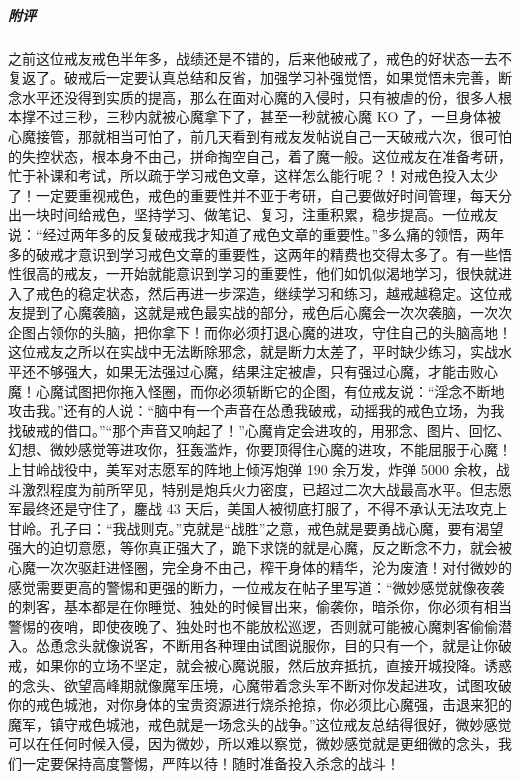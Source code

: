 \begin{case}
    \subparagraph{附评} 之前这位戒友戒色半年多，战绩还是不错的，后来他破戒了，戒色的好状态一去不复返了。破戒后一定要认真总结和反省，加强学习补强觉悟，如果觉悟未完善，断念水平还没得到实质的提高，那么在面对心魔的入侵时，只有被虐的份，很多人根本撑不过三秒，三秒内就被心魔拿下了，甚至一秒就被心魔 KO 了，一旦身体被心魔接管，那就相当可怕了，前几天看到有戒友发帖说自己一天破戒六次，很可怕的失控状态，根本身不由己，拼命掏空自己，着了魔一般。这位戒友在准备考研，忙于补课和考试，所以疏于学习戒色文章，这样怎么能行呢？！对戒色投入太少了！一定要重视戒色，戒色的重要性并不亚于考研，自己要做好时间管理，每天分出一块时间给戒色，坚持学习、做笔记、复习，注重积累，稳步提高。一位戒友说：“经过两年多的反复破戒我才知道了戒色文章的重要性。”多么痛的领悟，两年多的破戒才意识到学习戒色文章的重要性，这两年的精费也交得太多了。有一些悟性很高的戒友，一开始就能意识到学习的重要性，他们如饥似渴地学习，很快就进入了戒色的稳定状态，然后再进一步深造，继续学习和练习，越戒越稳定。这位戒友提到了心魔袭脑，这就是戒色最实战的部分，戒色后心魔会一次次袭脑，一次次企图占领你的头脑，把你拿下！而你必须打退心魔的进攻，守住自己的头脑高地！这位戒友之所以在实战中无法断除邪念，就是断力太差了，平时缺少练习，实战水平还不够强大，如果无法强过心魔，结果注定被虐，只有强过心魔，才能击败心魔！心魔试图把你拖入怪圈，而你必须斩断它的企图，有位戒友说：“淫念不断地攻击我。”还有的人说：“脑中有一个声音在怂恿我破戒，动摇我的戒色立场，为我找破戒的借口。”“那个声音又响起了！”心魔肯定会进攻的，用邪念、图片、回忆、幻想、微妙感觉等进攻你，狂轰滥炸，你要顶得住心魔的进攻，不能屈服于心魔！上甘岭战役中，美军对志愿军的阵地上倾泻炮弹 190 余万发，炸弹 5000 余枚，战斗激烈程度为前所罕见，特别是炮兵火力密度，已超过二次大战最高水平。但志愿军最终还是守住了，鏖战 43 天后，美国人被彻底打服了，不得不承认无法攻克上甘岭。孔子曰：“我战则克。”克就是“战胜”之意，戒色就是要勇战心魔，要有渴望强大的迫切意愿，等你真正强大了，跪下求饶的就是心魔，反之断念不力，就会被心魔一次次驱赶进怪圈，完全身不由己，榨干身体的精华，沦为废渣！对付微妙的感觉需要更高的警惕和更强的断力，一位戒友在帖子里写道：“微妙感觉就像夜袭的刺客，基本都是在你睡觉、独处的时候冒出来，偷袭你，暗杀你，你必须有相当警惕的夜哨，即使夜晚了、独处时也不能放松巡逻，否则就可能被心魔刺客偷偷潜入。怂恿念头就像说客，不断用各种理由试图说服你，目的只有一个，就是让你破戒，如果你的立场不坚定，就会被心魔说服，然后放弃抵抗，直接开城投降。诱惑的念头、欲望高峰期就像魔军压境，心魔带着念头军不断对你发起进攻，试图攻破你的戒色城池，对你身体的宝贵资源进行烧杀抢掠，你必须比心魔强，击退来犯的魔军，镇守戒色城池，戒色就是一场念头的战争。”这位戒友总结得很好，微妙感觉可以在任何时候入侵，因为微妙，所以难以察觉，微妙感觉就是更细微的念头，我们一定要保持高度警惕，严阵以待！随时准备投入杀念的战斗！
\end{case}

